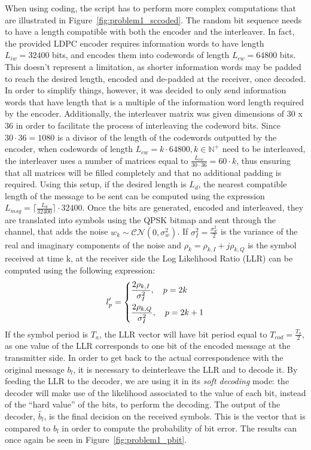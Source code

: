 \documentclass[10pt]{article}
\begin{document}

When using coding, the script has to perform more complex computations that are illustrated in Figure~\ref{fig:problem1_sccoded}. The random bit sequence needs to have a length compatible with both the encoder and the interleaver. In fact, the provided LDPC encoder requires information words to have length $L_{iw} = 32400$ bits, and encodes them into codewords of length $L_{cw} = 64800$ bits. This doesn't represent a limitation, as shorter information words may be padded to reach the desired length, encoded and de-padded at the receiver, once decoded. In order to simplify things, however, it was decided to only send information words that have length that is a multiple of the information word length required by the encoder. Additionally, the interleaver matrix was given dimensions of 30 x 36 in order to facilitate the process of interleaving the codeword bits. Since $30 \cdot 36 = 1080$ is a divisor of the length of the codewords outputted by the encoder, when codewords of length $L_{cw} = k \cdot 64800, k \in \mathbb{N^{+}}$ need to be interleaved, the interleaver uses a number of matrices equal to $\frac{L_{cw}}{30\cdot36} = 60 \cdot k$, thus ensuring that all matrices will be filled completely and that no additional padding is required. Using this setup, if the desired length is $L_d$, the nearest compatible length of the message to be sent can be computed using the expression $L_{msg} = \lceil \frac{L_{d}}{32400} \rceil \cdot 32400$. Once the bits are generated, encoded and interleaved, they are translated into symbols using the QPSK bitmap and sent through the channel, that adds the noise $w_k \sim \mathcal{CN}(0, \sigma_w^2)$. If $\sigma^2_I = \frac{\sigma^2_w}{2}$ is the variance of the real and imaginary components of the noise and $\rho_k = \rho_{k,I} + j \rho_{k,Q}$ is the symbol received at time k, at the receiver side the Log Likelihood Ratio (LLR) can be computed using the following expression:
\begin{equation}
	l'_p =
	\begin{dcases}
	\frac{2 \rho_{k,I}}{\sigma_I^2}, \quad p = 2k \\
	\frac{2 \rho_{k,Q}}{\sigma_I^2}, \quad p = 2k +1
	\end{dcases}
\end{equation}
If the symbol period is $T_a$, the LLR vector will have bit period equal to $T_{cod} = \frac{T_a}{2}$, as one value of the LLR corresponds to one bit of the encoded message at the transmitter side. In order to get back to the actual correspondence with the original message $b_l$, it is necessary to deinterleave the LLR and to decode it. By feeding the LLR to the decoder, we are using it in its \emph{soft decoding} mode: the decoder will make use of the likelihood associated to the value of each bit, instead of the ``hard value'' of the bits, to perform the decoding. %
The output of the decoder, $\hat{b}_l$, is the final decision on the received symbols. This is the vector that is compared to $b_l$ in order to compute the probability of bit error. The results can once again be seen in Figure~\ref{fig:problem1_pbit}. 
\end{document}
